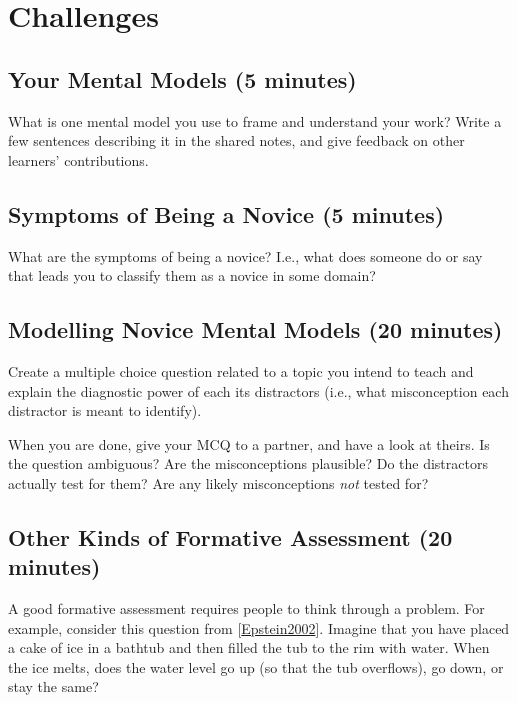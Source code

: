 \documentclass[10pt,statementpaper]{memoir}
\begin{document}
\section{Challenges}\label{challenges-1}

\subsection{Your Mental Models (5
minutes)}\label{your-mental-models-5-minutes}

What is one mental model you use to frame and understand your work?
Write a few sentences describing it in the shared notes, and give
feedback on other learners' contributions.

\subsection{Symptoms of Being a Novice (5
minutes)}\label{symptoms-of-being-a-novice-5-minutes}

What are the symptoms of being a novice? I.e., what does someone do or
say that leads you to classify them as a novice in some domain?

\subsection{Modelling Novice Mental Models (20
minutes)}\label{modelling-novice-mental-models-20-minutes}

Create a multiple choice question related to a topic you intend to teach
and explain the diagnostic power of each its distractors (i.e., what
misconception each distractor is meant to identify).

When you are done, give your MCQ to a partner, and have a look at
theirs. Is the question ambiguous? Are the misconceptions plausible? Do
the distractors actually test for them? Are any likely misconceptions
\emph{not} tested for?

\subsection{Other Kinds of Formative Assessment (20
minutes)}\label{other-kinds-of-formative-assessment-20-minutes}

A good formative assessment requires people to think through a problem.
For example, consider this question from
{[}\href{biblio.html\#epstein-thinking-physics}{Epstein2002}{]}. Imagine
that you have placed a cake of ice in a bathtub and then filled the tub
to the rim with water. When the ice melts, does the water level go up
(so that the tub overflows), go down, or stay the same?
\end{document}
